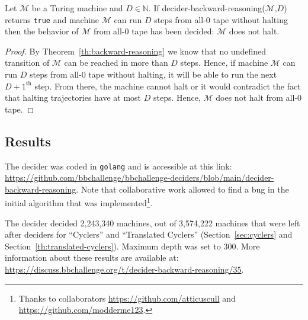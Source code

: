 \begin{corollary}\normalfont
  Let $\mathcal{M}$ be a Turing machine and $D\in\mathbb{N}$. If {\sc decider-backward-reasoning}($\mathcal{M}$,$D$) returns \texttt{true} and machine $\mathcal{M}$ can run $D$ steps from all-0 tape without halting then the behavior of $\mathcal{M}$ from all-0 tape has been decided: $\mathcal{M}$ does not halt.
\end{corollary}
\begin{proof}
By Theorem~\ref{th:backward-reasoning} we know that no undefined transition of $\mathcal{M}$ can be reached in more than $D$ steps. Hence, if machine $\mathcal{M}$ can run $D$ steps from all-0 tape without halting, it will be able to run the next $D+1^{\text{th}}$ step. From there, the machine cannot halt or it would contradict the fact that halting trajectories have at most $D$ steps. Hence, $\mathcal{M}$ does not halt from all-0 tape.
\end{proof}

\subsection{Results}

The decider was coded in \texttt{golang} and is accessible at this link: \url{https://github.com/bbchallenge/bbchallenge-deciders/blob/main/decider-backward-reasoning}. Note that collaborative work allowed to find a bug in the initial algorithm that was implemented\footnote{Thanks to collaborators \url{https://github.com/atticuscull} and \url{https://github.com/modderme123}.}.

The decider decided 2,243,340 machines, out of 3,574,222 machines that were left after deciders for ``Cyclers'' and ``Translated Cyclers'' (Section~\ref{sec:cyclers} and Section~\ref{th:translated-cyclers}). Maximum depth was set to 300. More information about these results are available at: \url{https://discuss.bbchallenge.org/t/decider-backward-reasoning/35}.
